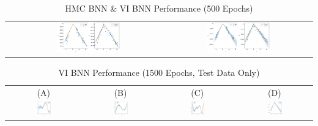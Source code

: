 \documentclass[conference]{IEEEtran}
\begin{document}
\begin{table}
\begin{tabular}{ccc}
 & \includegraphics[width=0.45\textwidth]{images/hmc_bnn--problem_D--sb.png} & \includegraphics[width=0.45\textwidth]{images/vi_bnn--problem_D--sb.png}
\end{tabular}
\caption{HMC BNN \& VI BNN Performance (500 Epochs)}
\label{tbl:table_of_figures}
\end{table}

\begin{table}
\centering
\begin{tabular}{cccc}
(A) & (B) & (C) & (D)\\
\includegraphics[width=0.21\textwidth]{images/vi_bnn--problem_A--sb--1500_epochs.png} & \includegraphics[width=0.21\textwidth]{images/vi_bnn--problem_B--sb--1500_epochs.png} & \includegraphics[width=0.21\textwidth]{images/vi_bnn--problem_C--sb--1500_epochs.png} & \includegraphics[width=0.21\textwidth]{images/vi_bnn--problem_D--sb--1500_epochs.png}
\end{tabular}
\caption{VI BNN Performance (1500 Epochs, Test Data Only)}
\label{tb2:table_of_figures}
\end{table}
\end{document}
